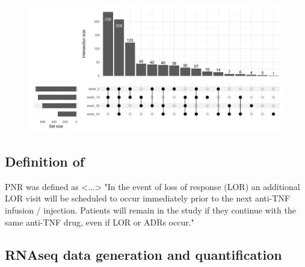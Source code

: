 \begin{outline}
\begin{figure}
    \centering
    \includegraphics[width=1.0\textwidth,page=1]{mainmatter/figures/chapter_04/process_pheno.pheno_filtered_dge.Visit_Label_upset.pdf}
    \caption{}
    \label{fig:multipants_visits_upset}
\end{figure}

\subsection{Definition of }

%
\1 \gls{PNR} was defined as <...>
\1 "In the event of loss of response (LOR) an additional LOR visit will be scheduled to occur immediately prior to the next anti-TNF infusion / injection.  Patients will remain in the study if they continue with the same anti-TNF drug, even if LOR or ADRs occur."

\subsection{RNAseq data generation and quantification}


\end{outline}
